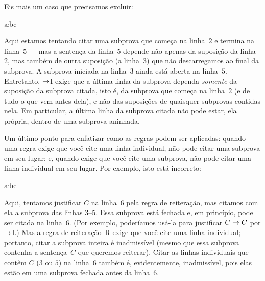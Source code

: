Eis mais um caso que precisamos excluir:
\begin{fitchproof}
\PR
\open
	\AS
	\open
	\AS
	\ae{bc}
	\close
\close
\ifHTMLtarget
{}
\else
{}
 
\fi
\end{fitchproof}
Aqui estamos tentando citar uma subprova que começa na linha~$2$ e termina na linha~$5$ — mas a sentença da linha~$5$ depende não apenas da suposição da linha~$2$, mas também de outra suposição (a linha~$3$) que não descarregamos ao final da subprova. A subprova iniciada na linha~$3$ ainda está aberta na linha~$5$. Entretanto, $\rightarrow$I exige que a última linha da subprova dependa \emph{somente} da suposição da subprova citada, isto é, da subprova que começa na linha~$2$ (e de tudo o que vem antes dela), e não das suposições de quaisquer subprovas contidas nela. Em particular, a última linha da subprova citada não pode estar, ela própria, dentro de uma subprova aninhada.


Um último ponto para enfatizar como as regras podem ser aplicadas: quando uma regra exige que você cite uma linha individual, não pode citar uma subprova em seu lugar; e, quando exige que você cite uma subprova, não pode citar uma linha individual em seu lugar. Por exemplo, isto está incorreto:
\begin{fitchproof}
\PR
\open
	\AS
	\open
	\AS
	\ae{bc}
	\close
\ifHTMLtarget
\else
{}
 
\fi
\close
{}
\end{fitchproof}
Aqui, tentamos justificar $C$ na linha~$6$ pela regra de reiteração,
mas citamos com ela a subprova das linhas $3$--$5$. Essa subprova está
fechada e, em princípio, pode ser citada na linha~$6$. (Por
exemplo, poderíamos usá-la para justificar $C \rightarrow C$ por $\rightarrow$I.) Mas a
regra de reiteração~R exige que você cite uma linha individual; portanto, citar
a subprova inteira é inadmissível (mesmo que essa subprova contenha
a sentença~$C$ que queremos reiterar). Citar as linhas individuais
que contêm $C$ ($3$ ou $5$) na linha~$6$ também é, evidentemente, inadmissível,
pois elas estão em uma subprova fechada antes da linha~$6$.


